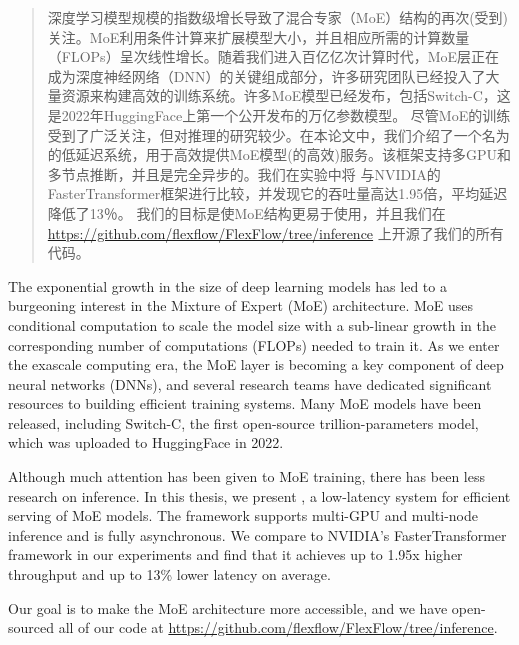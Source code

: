 

\begin{abstract}
  深度学习模型规模的指数级增长导致了混合专家（MoE）结构的再次(受到)关注。MoE利用条件计算来扩展模型大小，并且相应所需的计算数量（FLOPs）呈次线性增长。随着我们进入百亿亿次计算时代，MoE层正在成为深度神经网络（DNN）的关键组成部分，许多研究团队已经投入了大量资源来构建高效的训练系统。许多MoE模型已经发布，包括Switch-C，这是2022年HuggingFace上第一个公开发布的万亿参数模型。
尽管MoE的训练受到了广泛关注，但对推理的研究较少。在本论文中，我们介绍了一个名为 \Project 的低延迟系统，用于高效提供MoE模型(的高效)服务。该框架支持多GPU和多节点推断，并且是完全异步的。我们在实验中将 \Project 与NVIDIA的FasterTransformer框架进行比较，并发现它的吞吐量高达1.95倍，平均延迟降低了13％。
我们的目标是使MoE结构更易于使用，并且我们在 \url{https://github.com/flexflow/FlexFlow/tree/inference} 上开源了我们的所有代码。

\end{abstract}

\begin{abstract*}
  The exponential growth in the size of deep learning models has led to a burgeoning interest in the Mixture of Expert (MoE) architecture. MoE uses conditional computation to scale the model size with a sub-linear growth in the corresponding number of computations (FLOPs) needed to train it. As we enter the exascale computing era, the MoE layer is becoming a key component of deep neural networks (DNNs), and several research teams have dedicated significant resources to building efficient training systems. Many MoE models have been released, including Switch-C, the first open-source trillion-parameters model, which was uploaded to HuggingFace in 2022.
  
  Although much attention has been given to MoE training, there has been less research on inference. In this thesis, we present \Project, a low-latency system for efficient serving of MoE models. The framework supports multi-GPU and multi-node inference and is fully asynchronous. We compare \Project to NVIDIA's FasterTransformer framework in our experiments and find that it achieves up to 1.95x higher throughput and up to 13\% lower latency on average.
  
  Our goal is to make the MoE architecture more accessible, and we have open-sourced all of our code at \url{https://github.com/flexflow/FlexFlow/tree/inference}.

\end{abstract*}

